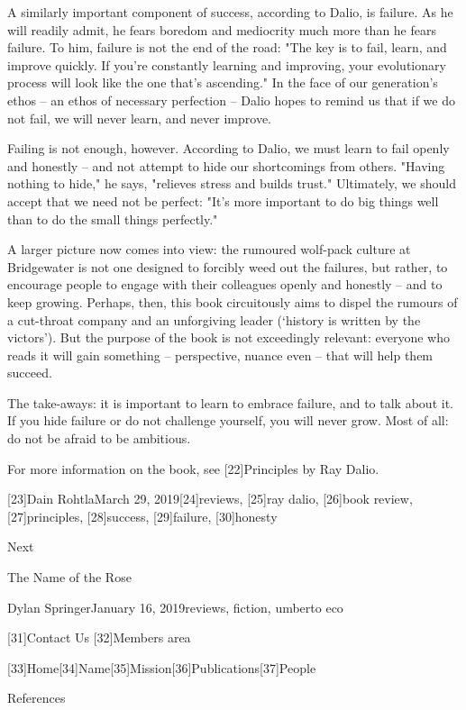    A similarly important component of success, according to Dalio, is
   failure. As he will readily admit, he fears boredom and mediocrity much
   more than he fears failure. To him, failure is not the end of the road:
   "The key is to fail, learn, and improve quickly. If you're constantly
   learning and improving, your evolutionary process will look like the
   one that's ascending." In the face of our generation's ethos -- an
   ethos of necessary perfection -- Dalio hopes to remind us that if we do
   not fail, we will never learn, and never improve.

   Failing is not enough, however. According to Dalio, we must learn to
   fail openly and honestly -- and not attempt to hide our shortcomings
   from others. "Having nothing to hide," he says, "relieves stress and
   builds trust." Ultimately, we should accept that we need not be
   perfect: "It's more important to do big things well than to do the
   small things perfectly."

   A larger picture now comes into view: the rumoured wolf-pack culture at
   Bridgewater is not one designed to forcibly weed out the failures, but
   rather, to encourage people to engage with their colleagues openly and
   honestly -- and to keep growing. Perhaps, then, this book circuitously
   aims to dispel the rumours of a cut-throat company and an unforgiving
   leader (`history is written by the victors'). But the purpose of the
   book is not exceedingly relevant: everyone who reads it will gain
   something -- perspective, nuance even -- that will help them succeed.

   The take-aways: it is important to learn to embrace failure, and to
   talk about it. If you hide failure or do not challenge yourself, you
   will never grow. Most of all: do not be afraid to be ambitious.

   For more information on the book, see [22]Principles by Ray Dalio.

   [23]Dain RohtlaMarch 29, 2019[24]reviews, [25]ray dalio, [26]book
   review, [27]principles, [28]success, [29]failure, [30]honesty

   Next

The Name of the Rose

   Dylan SpringerJanuary 16, 2019reviews, fiction, umberto eco

   [31]Contact Us
   [32]Members area

   [33]Home[34]Name[35]Mission[36]Publications[37]People

References

